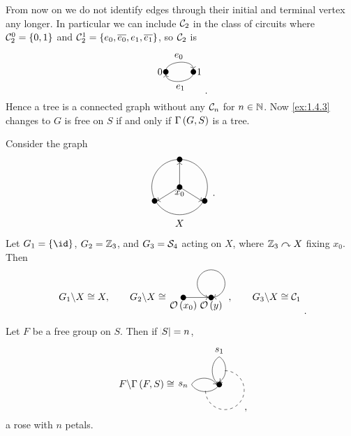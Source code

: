 
\begin{remark}
From now on we do not identify edges through their initial and terminal vertex any longer. In particular we can include $ \mathcal{C}_2 $ in the class of circuits where $ \CCC_2^0 = \cbr{0, 1} $ and $ \CCC_2^1 = \cbr{e_0, \overline{e_0}, e_1, \overline{e_1}} $, so $ \mathcal{C}_2 $ is
$$
\begin{tikzpicture}
\fill (0, 0) circle (0.1) node[left]{$ 0 $};
\fill (1, 0) circle (0.1) node[right]{$ 1 $};
\draw [->] (0, 0) to [bend left=90] node[above]{$ e_0 $} (1, 0.1);
\draw [->] (1, 0) to [bend left=90] node[below]{$ e_1 $} (0, -0.1);
\end{tikzpicture}.
$$
Hence a tree is a connected graph without any $ \mathcal{C}_n $ for $ n \in \mathbb{N} $. Now \ref{ex:1.4.3} changes to $ G $ is free on $ S $ if and only if $ \Gamma\br{G, S} $ is a tree.
\end{remark}

\pagebreak

\begin{example}
Consider the graph
$$
\begin{array}{c}
\begin{tikzpicture}
\fill (0, 0) circle (0.1) node[below]{$ x_0 $};
\fill (0, 1) circle (0.1);
\fill (-0.9, -0.5) circle (0.1);
\fill (0.9, -0.5) circle (0.1);
\draw [->] (0, 0) to (0, 0.9);
\draw [->] (0, 0) to (-0.8, -0.5);
\draw [->] (0, 0) to (0.8, -0.5);
\draw (0, 0) circle (1);
\end{tikzpicture}
\\
X
\end{array}.
$$
Let $ G_1 = \cbr{\id} $, $ G_2 = \mathbb{Z}_3 $, and $ G_3 = \mathcal{S}_4 $ acting on $ X $, where $ \mathbb{Z}_3 \curvearrowright X $ fixing $ x_0 $. Then
$$
\begin{tikzpicture}
\draw (-0.5, 0) node[left]{$ G_1 \backslash X \cong X, \qquad G_2 \backslash X \cong $};
\fill (0, 0) circle (0.1) node[below]{$ \OOO\br{x_0} $};
\fill (1, 0) circle (0.1) node[below]{$ \OOO\br{y} $};
\draw [->] (0, 0) to (0.9, 0);
\draw [->] (1, 0) arc (270:-80:0.5);
\draw (1.5, 0) node[right]{$, \qquad G_3 \backslash X \cong \CCC_1 $};
\end{tikzpicture}.
$$
\end{example}

\begin{example}
Let $ F $ be a free group on $ S $. Then if $ \abs{S} = n $,
$$
\begin{tikzpicture}
\draw (-1.5, 0) node[left]{$ F \backslash \Gamma\br{F, S} \cong $};
\fill (0, 0) circle (0.1);
\draw (0, 0) to [bend left=60] (0, 1) node[above]{$ s_1 $};
\draw [->] (0, 1) to [bend left=60] (0, 0.1);
\draw [dashed] (0.2, 0.5) arc (90:-180:0.7);
\draw (0, 0) to [bend left=60] (-1, 0) node[left]{$ s_n $};
\draw [->] (-1, 0) to [bend left=60] (-0.1, 0);
\end{tikzpicture},
$$
a rose with $ n $ petals.
\end{example}

